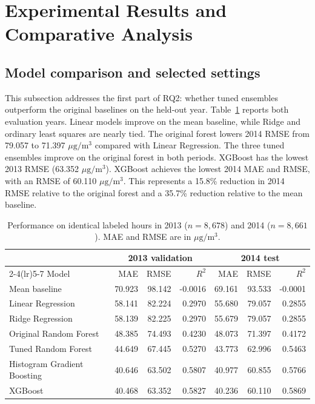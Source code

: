 \documentclass[11pt]{article}
\newcommand{\conc}{\ensuremath{\mu\mathrm{g}/\mathrm{m}^3}}
\begin{document}
\section{Experimental Results and Comparative Analysis}
\subsection{Model comparison and selected settings}
This subsection addresses the first part of RQ2: whether tuned ensembles outperform the original baselines on the held-out year.
Table~\ref{tab:comparison} reports both evaluation years. Linear models improve on the mean baseline, while Ridge and ordinary least squares are nearly tied. The original forest lowers 2014 RMSE from 79.057 to 71.397 \conc{} compared with Linear Regression. The three tuned ensembles improve on the original forest in both periods. XGBoost has the lowest 2013 RMSE (63.352 \conc{}). XGBoost achieves the lowest 2014 MAE and RMSE, with an RMSE of 60.110 \conc{}. This represents a 15.8\% reduction in 2014 RMSE relative to the original forest and a 35.7\% reduction relative to the mean baseline.

\begin{table}[htbp]
\centering
\small
\caption{Performance on identical labeled hours in 2013 ($n=8{,}678$) and 2014 ($n=8{,}661$). MAE and RMSE are in \conc{}.}
\label{tab:comparison}
\begin{tabular}{@{}lrrrrrr@{}}
\toprule
& \multicolumn{3}{c}{2013 validation} & \multicolumn{3}{c}{2014 test} \\
\cmidrule(lr){2-4}\cmidrule(lr){5-7}
Model & MAE & RMSE & $R^2$ & MAE & RMSE & $R^2$ \\
\midrule
Mean baseline & 70.923 & 98.142 & -0.0016 & 69.161 & 93.533 & -0.0001 \\
Linear Regression & 58.141 & 82.224 & 0.2970 & 55.680 & 79.057 & 0.2855 \\
Ridge Regression & 58.139 & 82.225 & 0.2970 & 55.679 & 79.057 & 0.2855 \\
Original Random Forest & 48.385 & 74.493 & 0.4230 & 48.073 & 71.397 & 0.4172 \\
Tuned Random Forest & 44.649 & 67.445 & 0.5270 & 43.773 & 62.996 & 0.5463 \\
Histogram Gradient Boosting & 40.646 & 63.502 & 0.5807 & 40.977 & 60.855 & 0.5766 \\
XGBoost & 40.468 & 63.352 & 0.5827 & 40.236 & 60.110 & 0.5869 \\
\bottomrule
\end{tabular}
\end{table}
\end{document}
